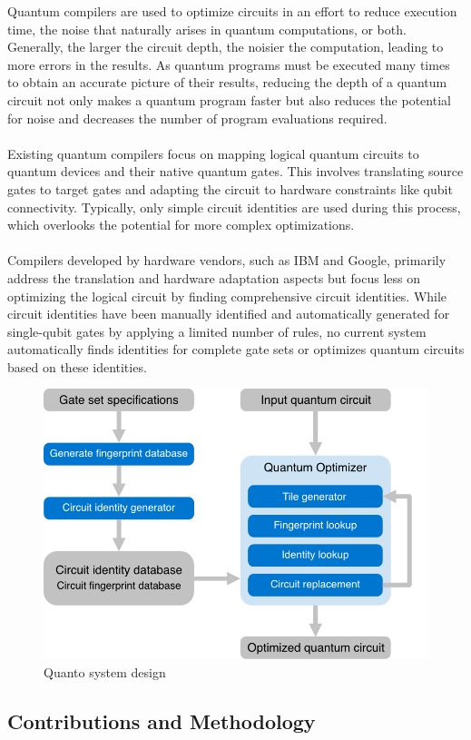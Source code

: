Quantum compilers are used to optimize circuits in an effort to reduce execution time, the noise that naturally arises in quantum computations, or both. Generally, the larger the circuit depth, the noisier the computation, leading to more errors in the results. As quantum programs must be executed many times to obtain an accurate picture of their results, reducing the depth of a quantum circuit not only makes a quantum program faster but also reduces the potential for noise and decreases the number of program evaluations required.
\\\\
Existing quantum compilers focus on mapping logical quantum circuits to quantum devices and their native quantum gates. This involves translating source gates to target gates and adapting the circuit to hardware constraints like qubit connectivity. Typically, only simple circuit identities are used during this process, which overlooks the potential for more complex optimizations.
\\\\
Compilers developed by hardware vendors, such as IBM and Google, primarily address the translation and hardware adaptation aspects but focus less on optimizing the logical circuit by finding comprehensive circuit identities. While circuit identities have been manually identified and automatically generated for single-qubit gates by applying a limited number of rules, no current system automatically finds identities for complete gate sets or optimizes quantum circuits based on these identities.

\begin{figure}
  \includegraphics[width=0.7\columnwidth]{assets/quanto_system.png}
  \caption{Quanto system design}
  \label{fig:quanto_system}
\end{figure}
\subsection{Contributions and Methodology}

